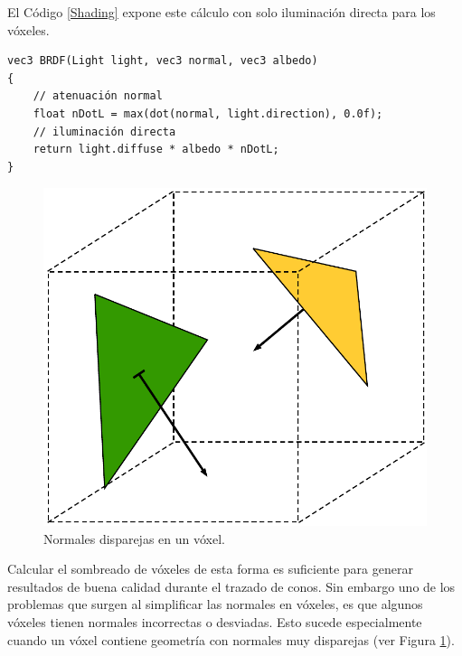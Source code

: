 El Código \ref{Shading} expone este cálculo con solo iluminación directa para los vóxeles.
\\
\begin{lstlisting}[caption={Sombreado estándar para un vóxel}, label=Shading]
vec3 BRDF(Light light, vec3 normal, vec3 albedo)
{
	// atenuación normal
	float nDotL = max(dot(normal, light.direction), 0.0f);
	// iluminación directa
	return light.diffuse * albedo * nDotL;
}
\end{lstlisting}
\newpage
\begin{figure}
	\centering
	\captionsetup{justification=centering}
	\includegraphics[width=\linewidth]{media/gimped_normals.pdf}
	\caption{Normales disparejas en un vóxel.}
	\label{fig:error_normals}
\end{figure}
\noindent Calcular el sombreado de vóxeles de esta forma es suficiente para generar resultados de buena calidad durante el trazado de conos. Sin embargo uno de los problemas que surgen al simplificar las normales en vóxeles, es que algunos vóxeles tienen normales incorrectas o desviadas. Esto sucede especialmente cuando un vóxel contiene geometría con normales muy disparejas (ver Figura \ref{fig:error_normals}).

